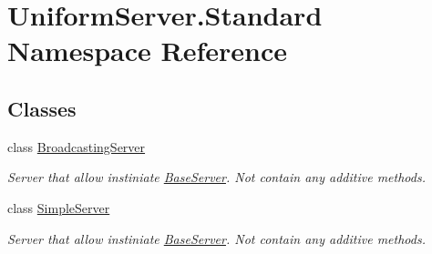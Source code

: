 \hypertarget{namespace_uniform_server_1_1_standard}{}\section{Uniform\+Server.\+Standard Namespace Reference}
\label{namespace_uniform_server_1_1_standard}
\subsection*{Classes}
\begin{DoxyCompactItemize}
\item 
class \mbox{\hyperlink{class_uniform_server_1_1_standard_1_1_broadcasting_server}{Broadcasting\+Server}}
\begin{DoxyCompactList}\small\item\em Server that allow instiniate \mbox{\hyperlink{class_uniform_server_1_1_base_server}{Base\+Server}}. Not contain any additive methods. \end{DoxyCompactList}\item 
class \mbox{\hyperlink{class_uniform_server_1_1_standard_1_1_simple_server}{Simple\+Server}}
\begin{DoxyCompactList}\small\item\em Server that allow instiniate \mbox{\hyperlink{class_uniform_server_1_1_base_server}{Base\+Server}}. Not contain any additive methods. \end{DoxyCompactList}\end{DoxyCompactItemize}
